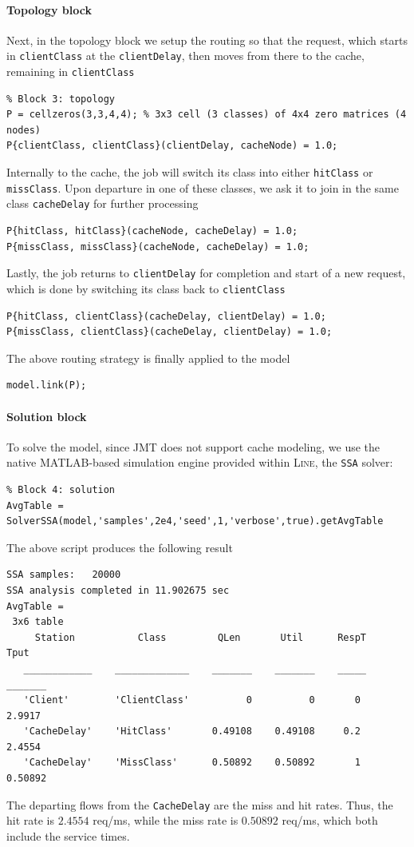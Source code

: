 \paragraph{Topology block}
Next, in the topology block we setup the routing so that the request, which starts in \texttt{clientClass} at the \texttt{clientDelay}, then moves from there to the cache, remaining in \texttt{clientClass}
\begin{lstlisting}
% Block 3: topology
P = cellzeros(3,3,4,4); % 3x3 cell (3 classes) of 4x4 zero matrices (4 nodes)
P{clientClass, clientClass}(clientDelay, cacheNode) = 1.0;
\end{lstlisting}
Internally to the cache, the job will switch its class into either \texttt{hitClass} or \texttt{missClass}. Upon departure in one of these classes, we ask it to join in the same class \texttt{cacheDelay} for further processing
\begin{lstlisting}
P{hitClass, hitClass}(cacheNode, cacheDelay) = 1.0;
P{missClass, missClass}(cacheNode, cacheDelay) = 1.0;
\end{lstlisting}
Lastly, the job returns to \texttt{clientDelay} for completion and start of a new request, which is done by switching its class back to \texttt{clientClass}
\begin{lstlisting}
P{hitClass, clientClass}(cacheDelay, clientDelay) = 1.0;
P{missClass, clientClass}(cacheDelay, clientDelay) = 1.0;
\end{lstlisting}
The above routing strategy is finally applied to the model
\begin{lstlisting}
model.link(P);
\end{lstlisting}

\paragraph{Solution block}
To solve the model, since JMT does not support cache modeling, we use the native MATLAB-based simulation engine provided within \textsc{Line}, the \texttt{SSA} solver:
\begin{lstlisting}
% Block 4: solution
AvgTable = SolverSSA(model,'samples',2e4,'seed',1,'verbose',true).getAvgTable
\end{lstlisting}
The above script produces the following result
\begin{lstlisting}
SSA samples:   20000
SSA analysis completed in 11.902675 sec
AvgTable =
 3x6 table
     Station           Class         QLen       Util      RespT     Tput
   ____________    _____________    _______    _______    _____    _______
   'Client'        'ClientClass'          0          0       0      2.9917
   'CacheDelay'    'HitClass'       0.49108    0.49108     0.2      2.4554
   'CacheDelay'    'MissClass'      0.50892    0.50892       1     0.50892
\end{lstlisting}
The departing flows from the \texttt{CacheDelay} are the miss and hit rates. Thus, the hit rate is $2.4554$ req/ms, while the miss rate is $0.50892$ req/ms, which both include the service times.

